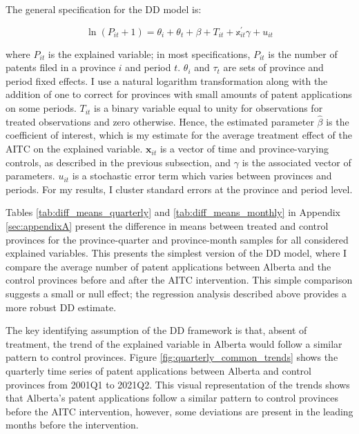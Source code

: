 \documentclass[../main.tex]{subfiles}
\begin{document}
The general specification for the DD model is:

\begin{equation}
    \label{eq:dd_model}
    \ln(P_{it} + 1) = \theta_i + \theta_t + \beta + T_{it} + \mathbb{x}_{it}^{'} \gamma + u_{it}
\end{equation}

where $P_{it}$ is the explained variable; in most specifications, $P_{it}$ is the number of patents filed in a province $i$ and period $t$. $\theta_i$ and $\tau_t$ are sets of province and period fixed effects. I use a natural logarithm transformation along with the addition of one to correct for provinces with small amounts of patent applications on some periods. $T_{it}$ is a binary variable equal to unity for observations for treated observations and zero otherwise. Hence, the estimated parameter $\hat{\beta}$ is the coefficient of interest, which is my estimate for the average treatment effect of the AITC on the explained variable. $\mathbf{x}_{it}$ is a vector of time and province-varying controls, as described in the previous subsection, and $\gamma$ is the associated vector of parameters. $u_{it}$ is a stochastic error term which varies between provinces and periods. For my results, I cluster standard errors at the province and period level. 

Tables \ref{tab:diff_means_quarterly} and \ref{tab:diff_means_monthly} in Appendix \ref{sec:appendixA} present the difference in means between treated and control provinces for the province-quarter and province-month samples for all considered explained variables. This presents the simplest version of the DD model, where I compare the average number of patent applications between Alberta and the control provinces before and after the AITC intervention. This simple comparison suggests a small or null effect; the regression analysis described above provides a more robust DD estimate. 

The key identifying assumption of the DD framework is that, absent of treatment, the trend of the explained variable in Alberta would follow a similar pattern to control provinces. Figure \ref{fig:quarterly_common_trends} shows the quarterly time series of patent applications between Alberta and control provinces from 2001Q1 to 2021Q2. This visual representation of the trends shows that Alberta's patent applications follow a similar pattern to control provinces before the AITC intervention, however, some deviations are present in the leading months before the intervention.
\end{document}
